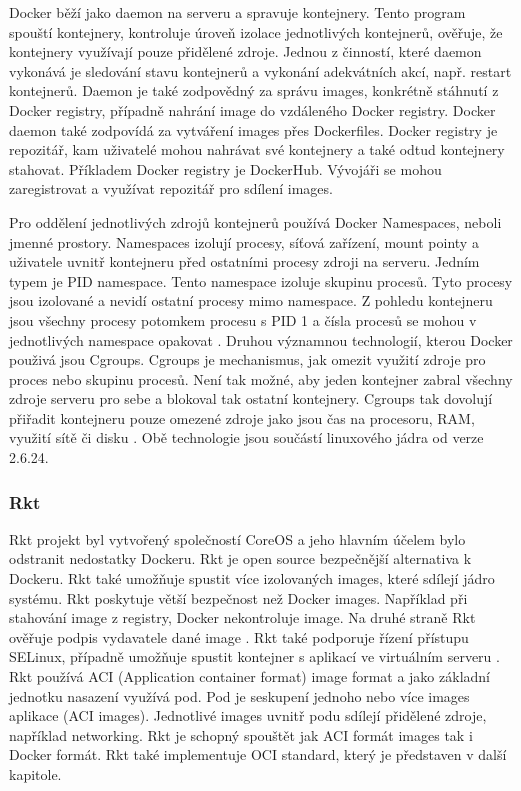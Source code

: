 Docker běží jako daemon na serveru a spravuje kontejnery. Tento program spouští kontejnery, kontroluje úroveň izolace jednotlivých kontejnerů, ověřuje, že kontejnery využívají pouze přidělené zdroje. Jednou z činností, které daemon vykonává je sledování stavu kontejnerů a vykonání adekvátních akcí, např. restart kontejnerů. Daemon je také zodpovědný za správu images, konkrétně stáhnutí z Docker registry, případně nahrání image do vzdáleného Docker registry. Docker daemon také zodpovídá za vytváření images přes Dockerfiles. Docker registry je repozitář, kam uživatelé mohou nahrávat své kontejnery a také odtud kontejnery stahovat. Příkladem Docker \linebreak registry je DockerHub. Vývojáři se mohou zaregistrovat a využívat repozitář pro sdílení images. \par
Pro oddělení jednotlivých zdrojů kontejnerů používá Docker Namespaces, neboli jmenné prostory. Namespaces izolují procesy, síťová zařízení, mount pointy a uživatele uvnitř kontejneru před ostatními procesy zdroji na serveru. Jedním typem je PID namespace. Tento namespace izoluje skupinu procesů. Tyto procesy jsou izolované a nevidí ostatní procesy mimo namespace. Z pohledu kontejneru jsou všechny procesy potomkem procesu s PID 1 a čísla procesů se mohou v jednotlivých namespace opakovat \cite{namespaces}. Druhou významnou technologií, kterou Docker použivá jsou Cgroups. Cgroups je mechanismus, jak omezit využití zdroje pro proces nebo skupinu procesů. Není tak možné, aby jeden kontejner zabral všechny zdroje serveru pro sebe a blokoval tak ostatní kontejnery. Cgroups tak dovolují přiřadit kontejneru pouze omezené zdroje jako jsou čas na procesoru, RAM, využití sítě či disku \cite{cgroup}. Obě technologie jsou součástí linuxového jádra od verze 2.6.24.\par
\subsubsection{Rkt}
Rkt projekt byl vytvořený společností CoreOS a jeho hlavním účelem bylo odstranit nedostatky Dockeru. Rkt je open source bezpečnější alternativa k Dockeru. Rkt také umožňuje spustit více izolovaných images, které sdílejí jádro systému. Rkt poskytuje větší bezpečnost než Docker images. Například při stahování image z registry, Docker nekontroluje image. Na druhé straně Rkt ověřuje podpis vydavatele dané image \cite{ROCKET}. Rkt také podporuje řízení přístupu SELinux, případně umožňuje spustit \linebreak kontejner s aplikací ve virtuálním serveru \cite{selinux}. Rkt používá ACI (Application container format) image format a jako základní jednotku nasazení využívá pod. Pod je seskupení jednoho nebo více images aplikace (ACI images). Jednotlivé images uvnitř podu sdílejí přidělené zdroje, například networking. Rkt je schopný spouštět jak ACI formát \linebreak images tak i Docker formát. Rkt také implementuje OCI standard, který je představen v další kapitole.

